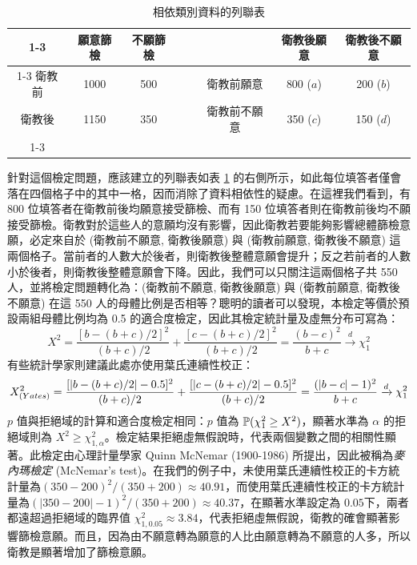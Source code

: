     \begin{table}[htbp]
        \begin{center}
            \begin{tabular}{c|ccccc|cc}
                \cline{1-3}\cline{6-8}
                 & 願意篩檢 & 不願篩檢 &&& & 衛教後願意 & 衛教後不願意\\
                \cline{1-3}\cline{6-8}
                衛教前 & 1000 & 500 &&& 衛教前願意& 800 ($a$) & 200 ($b$)\\
                衛教後 & 1150 & 350 &&& 衛教前不願意& 350 ($c$) & 150 ($d$)\\
                \cline{1-3}\cline{6-8}
            \end{tabular}
            \caption{相依類別資料的列聯表\label{tab:mcnemar_table}}
        \end{center}
    \end{table}

    針對這個檢定問題，應該建立的列聯表如表 \ref{tab:mcnemar_table} 的右側所示，如此每位填答者僅會落在四個格子中的其中一格，因而消除了資料相依性的疑慮。在這裡我們看到，有 800 位填答者在衛教前後均願意接受篩檢、而有 150 位填答者則在衛教前後均不願接受篩檢。衛教對於這些人的意願均沒有影響，因此衛教若要能夠影響總體篩檢意願，必定來自於 (衛教前不願意, 衛教後願意) 與 (衛教前願意, 衛教後不願意) 這兩個格子。當前者的人數大於後者，則衛教後整體意願會提升；反之若前者的人數小於後者，則衛教後整體意願會下降。因此，我們可以只關注這兩個格子共 550 人，並將檢定問題轉化為：(衛教前不願意, 衛教後願意) 與 (衛教前願意, 衛教後不願意) 在這 550 人的母體比例是否相等？聰明的讀者可以發現，本檢定等價於預設兩組母體比例均為 0.5 的適合度檢定，因此其檢定統計量及虛無分布可寫為：
    \smallskip
    \[X^2 = \frac{[b-(b+c)/2]^2}{(b+c)/2} + \frac{[c-(b+c)/2]^2}{(b+c)/2} = \frac{(b-c)^2}{b+c} \xrightarrow[]{d} \chi^2_1\]
    \smallskip
    有些統計學家則建議此處亦使用葉氏連續性校正：
    \smallskip
    \[X^2_{\text(Yates)} = \frac{[|b-(b+c)/2|-0.5]^2}{(b+c)/2} + \frac{[|c-(b+c)/2|-0.5]^2}{(b+c)/2} = \frac{(|b-c|-1)^2}{b+c} \xrightarrow[]{d} \chi^2_1\]
    \smallskip
    $p$ 值與拒絕域的計算和適合度檢定相同：$p$ 值為 $\mathbb{P}(\chi^2_1 \ge X^2)$，顯著水準為 $\alpha$ 的拒絕域則為 $X^2 \ge \chi^2_{1, \alpha}$。檢定結果拒絕虛無假說時，代表兩個變數之間的相關性顯著。此檢定由心理計量學家 Quinn McNemar (1900-1986) 所提出，因此被稱為\textit{麥內瑪檢定} (McNemar's test)。在我們的例子中，未使用葉氏連續性校正的卡方統計量為$(350-200)^2/(350+200) \approx 40.91$，而使用葉氏連續性校正的卡方統計量為$(|350-200|-1)^2/(350+200) \approx 40.37$，在顯著水準設定為 $0.05$下，兩者都遠超過拒絕域的臨界值 $\chi^2_{1,0.05} \approx 3.84$，代表拒絕虛無假說，衛教的確會顯著影響篩檢意願。而且，因為由不願意轉為願意的人比由願意轉為不願意的人多，所以衛教是顯著增加了篩檢意願。

